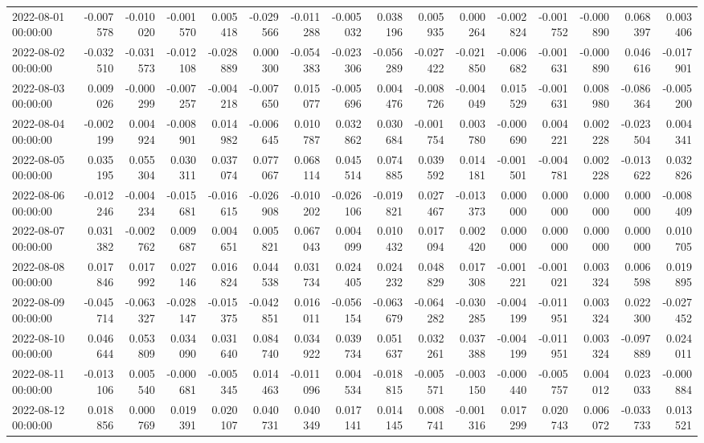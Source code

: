 \begin{tabular}{lrrrrrrrrrrrrrrr}
2022-08-01 00:00:00 & -0.007578 & -0.010020 & -0.001570 & 0.005418 & -0.029566 & -0.011288 & -0.005032 & 0.038196 & 0.005935 & 0.000264 & -0.002824 & -0.001752 & -0.000890 & 0.068397 & 0.003406 \\
2022-08-02 00:00:00 & -0.032510 & -0.031573 & -0.012108 & -0.028889 & 0.000300 & -0.054383 & -0.023306 & -0.056289 & -0.027422 & -0.021850 & -0.006682 & -0.001631 & -0.000890 & 0.046616 & -0.017901 \\
2022-08-03 00:00:00 & 0.009026 & -0.000299 & -0.007257 & -0.004218 & -0.007650 & 0.015077 & -0.005696 & 0.004476 & -0.008726 & -0.004049 & 0.015529 & -0.001631 & 0.008980 & -0.086364 & -0.005200 \\
2022-08-04 00:00:00 & -0.002199 & 0.004924 & -0.008901 & 0.014982 & -0.006645 & 0.010787 & 0.032862 & 0.030684 & -0.001754 & 0.003780 & -0.000690 & 0.004221 & 0.002228 & -0.023504 & 0.004341 \\
2022-08-05 00:00:00 & 0.035195 & 0.055304 & 0.030311 & 0.037074 & 0.077067 & 0.068114 & 0.045514 & 0.074885 & 0.039592 & 0.014181 & -0.001501 & -0.004781 & 0.002228 & -0.013622 & 0.032826 \\
2022-08-06 00:00:00 & -0.012246 & -0.004234 & -0.015681 & -0.016615 & -0.026908 & -0.010202 & -0.026106 & -0.019821 & 0.027467 & -0.013373 & 0.000000 & 0.000000 & 0.000000 & 0.000000 & -0.008409 \\
2022-08-07 00:00:00 & 0.031382 & -0.002762 & 0.009687 & 0.004651 & 0.005821 & 0.067043 & 0.004099 & 0.010432 & 0.017094 & 0.002420 & 0.000000 & 0.000000 & 0.000000 & 0.000000 & 0.010705 \\
2022-08-08 00:00:00 & 0.017846 & 0.017992 & 0.027146 & 0.016824 & 0.044538 & 0.031734 & 0.024405 & 0.024232 & 0.048829 & 0.017308 & -0.001221 & -0.001021 & 0.003324 & 0.006598 & 0.019895 \\
2022-08-09 00:00:00 & -0.045714 & -0.063327 & -0.028147 & -0.015375 & -0.042851 & 0.016011 & -0.056154 & -0.063679 & -0.064282 & -0.030285 & -0.004199 & -0.011951 & 0.003324 & 0.022300 & -0.027452 \\
2022-08-10 00:00:00 & 0.046644 & 0.053809 & 0.034090 & 0.031640 & 0.084740 & 0.034922 & 0.039734 & 0.051637 & 0.032261 & 0.037388 & -0.004199 & -0.011951 & 0.003324 & -0.097889 & 0.024011 \\
2022-08-11 00:00:00 & -0.013106 & 0.005540 & -0.000681 & -0.005345 & 0.014463 & -0.011096 & 0.004534 & -0.018815 & -0.005571 & -0.003150 & -0.000440 & -0.005757 & 0.004012 & 0.023033 & -0.000884 \\
2022-08-12 00:00:00 & 0.018856 & 0.000769 & 0.019391 & 0.020107 & 0.040731 & 0.040349 & 0.017141 & 0.014145 & 0.008741 & -0.001316 & 0.017299 & 0.020743 & 0.006072 & -0.033733 & 0.013521 \\

\end{tabular}
